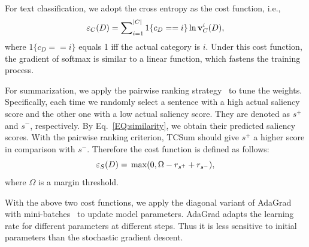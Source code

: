 \documentclass[letterpaper]{article}
\begin{document}
For text classification, we adopt the cross entropy as the cost function, i.e.,
\begin{equation}
{\varepsilon _C}(D) = \sum\nolimits_{i = 1}^{|C|} {1\{ c_D =  = i\} \ln {\bf{v}}_C^i(D)}, 
\end{equation}
where ${1\{ c_D =  = i\} }$ equals 1 iff the actual category is $i$.
Under this cost function, the gradient of softmax is similar to a linear function, which fastens the training process.

For summarization, we apply the pairwise ranking strategy~\cite{Collobert2011}  to tune the weights.
Specifically, each time we randomly select a sentence with a high actual saliency score and the other one with a low actual saliency score.
They are denoted as $s^+$ and $s^-$, respectively.
By Eq.~\ref{EQ:similarity}, we obtain their predicted saliency scores.
With the pairwise ranking criterion, TCSum should give $s^+$ a higher score in comparison with $s^-$.
Therefore the cost function is defined as follows:
\begin{equation} \label{eq:cost}
{\varepsilon _S}(D) = {\rm{ }}\max (0,\Omega  - r_{{s^ + }} + r_{{s^ - }}),
\end{equation}
where $\Omega$ is a margin threshold.

With the above two cost functions, we apply the diagonal variant of AdaGrad with mini-batches~\cite{duchi2011adaptive} to update model parameters.
AdaGrad adapts the learning rate for different parameters at different steps.
Thus it is less sensitive to initial parameters than the stochastic gradient descent.
\end{document}
